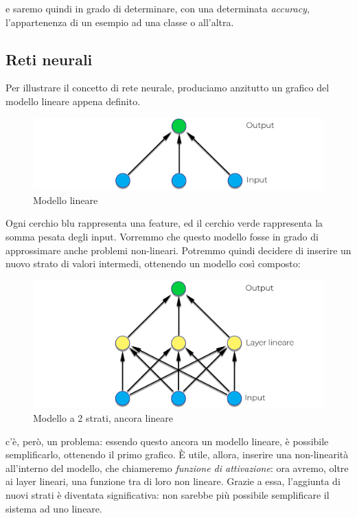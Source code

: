 e saremo quindi in grado di determinare, con una determinata \textit{accuracy}, l'appartenenza di un esempio ad una classe o all'altra.
\subsection{Reti neurali}
Per illustrare il concetto di rete neurale, produciamo anzitutto un grafico del modello lineare appena definito.
\begin{figure}[H]
    \begin{center}
        \includegraphics[width=0.8\columnwidth]{images/stateofart/linear-NN.png}
    \end{center}
    \caption{Modello lineare}
    \label{fig:linear-NN}
\end{figure}
Ogni cerchio blu rappresenta una feature, ed il cerchio verde rappresenta la somma pesata degli input. Vorremmo che questo modello fosse in grado di approssimare anche problemi non-lineari. Potremmo quindi decidere di inserire un nuovo strato di valori intermedi, ottenendo un modello così composto:
\begin{figure}[H]
    \begin{center}
        \includegraphics[width=0.8\columnwidth]{images/stateofart/double-linear-NN.png}
    \end{center}
    \caption{Modello a 2 strati, ancora lineare}
    \label{fig:double-linear-NN}
\end{figure}
c'è, però, un problema: essendo questo ancora un modello lineare, è possibile semplificarlo, ottenendo il primo grafico. È utile, allora, inserire una non-linearità all'interno del modello, che chiameremo \textit{funzione di attivazione}: ora avremo, oltre ai layer lineari, una funzione tra di loro non lineare. Grazie a essa, l'aggiunta di nuovi strati è diventata significativa: non sarebbe più possibile semplificare il sistema ad uno lineare.
